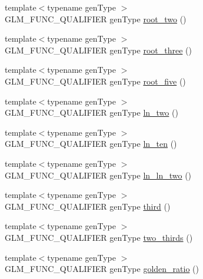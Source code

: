 \begin{DoxyCompactItemize}
\item 
{\footnotesize template$<$typename gen\-Type $>$ }\\G\-L\-M\-\_\-\-F\-U\-N\-C\-\_\-\-Q\-U\-A\-L\-I\-F\-I\-E\-R gen\-Type \hyperlink{group__gtc__constants_gab91b7799f88f9f2be33e385dec11b9c2}{root\-\_\-two} ()
\item 
{\footnotesize template$<$typename gen\-Type $>$ }\\G\-L\-M\-\_\-\-F\-U\-N\-C\-\_\-\-Q\-U\-A\-L\-I\-F\-I\-E\-R gen\-Type \hyperlink{group__gtc__constants_gab3183635ac615473e2f95852f491be83}{root\-\_\-three} ()
\item 
{\footnotesize template$<$typename gen\-Type $>$ }\\G\-L\-M\-\_\-\-F\-U\-N\-C\-\_\-\-Q\-U\-A\-L\-I\-F\-I\-E\-R gen\-Type \hyperlink{group__gtc__constants_gace2b8dfed1ab9fabbb67dde08e7e5b58}{root\-\_\-five} ()
\item 
{\footnotesize template$<$typename gen\-Type $>$ }\\G\-L\-M\-\_\-\-F\-U\-N\-C\-\_\-\-Q\-U\-A\-L\-I\-F\-I\-E\-R gen\-Type \hyperlink{group__gtc__constants_ga22fae798430edc3022766af4fd83e8a4}{ln\-\_\-two} ()
\item 
{\footnotesize template$<$typename gen\-Type $>$ }\\G\-L\-M\-\_\-\-F\-U\-N\-C\-\_\-\-Q\-U\-A\-L\-I\-F\-I\-E\-R gen\-Type \hyperlink{group__gtc__constants_ga48addf0cb0980277d208a71a1c59c073}{ln\-\_\-ten} ()
\item 
{\footnotesize template$<$typename gen\-Type $>$ }\\G\-L\-M\-\_\-\-F\-U\-N\-C\-\_\-\-Q\-U\-A\-L\-I\-F\-I\-E\-R gen\-Type \hyperlink{group__gtc__constants_ga650774609debe4a90bcac449b574de2c}{ln\-\_\-ln\-\_\-two} ()
\item 
{\footnotesize template$<$typename gen\-Type $>$ }\\G\-L\-M\-\_\-\-F\-U\-N\-C\-\_\-\-Q\-U\-A\-L\-I\-F\-I\-E\-R gen\-Type \hyperlink{group__gtc__constants_gabf280496105e0ad070287417f840ebd8}{third} ()
\item 
{\footnotesize template$<$typename gen\-Type $>$ }\\G\-L\-M\-\_\-\-F\-U\-N\-C\-\_\-\-Q\-U\-A\-L\-I\-F\-I\-E\-R gen\-Type \hyperlink{group__gtc__constants_gadde7f2efce3b14c8b26944fbafed4a10}{two\-\_\-thirds} ()
\item 
{\footnotesize template$<$typename gen\-Type $>$ }\\G\-L\-M\-\_\-\-F\-U\-N\-C\-\_\-\-Q\-U\-A\-L\-I\-F\-I\-E\-R gen\-Type \hyperlink{group__gtc__constants_gafd53093ef2d756333865d774bea3cdf9}{golden\-\_\-ratio} ()

\end{DoxyCompactItemize}
